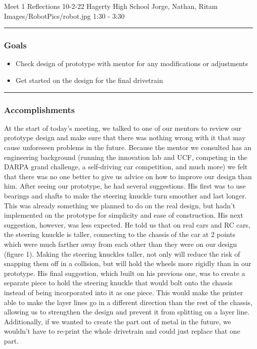 \insertmeeting 
	{Meet 1 Reflections} 
	{10-2-22} 
	{Hagerty High School}
	{Jorge, Nathan, Ritam}
	{Images/RobotPics/robot.jpg}
	{1:30 - 3:30}
	
\noindent\hfil\rule{\textwidth}{.4pt}\hfil
\subsubsection*{Goals}
\begin{itemize}
    \item Check design of prototype with mentor for any modifications or adjustments
    \item Get started on the design for the final drivetrain


\end{itemize} 

\noindent\hfil\rule{\textwidth}{.4pt}\hfil

\subsubsection*{Accomplishments}
At the start of today’s meeting, we talked to one of our mentors to review our prototype design and make sure that there was nothing wrong with it that may cause unforeseen problems in the future. Because the mentor we consulted has an engineering background (running the innovation lab and UCF, competing in the DARPA grand challenge, a self-driving car competition, and much more) we felt that there was no one better to give us advice on how to improve our design than him. After seeing our prototype, he had several suggestions. His first was to use bearings and shafts to make the steering knuckle turn smoother and last longer. This was already something we planned to do on the real design, but hadn’t implemented on the prototype for simplicity and ease of construction. His next suggestion, however, was less expected. He told us that on real cars and RC cars, the steering knuckle is taller, connecting to the chassis of the car at 2 points which were much farther away from each other than they were on our design (figure 1). Making the steering knuckles taller, not only will reduce the risk of snapping them off in a collision, but will hold the wheels more rigidly than in our prototype. His final suggestion, which built on his previous one, was to create a separate piece to hold the steering knuckle that would bolt onto the chassis instead of being incorporated into it as one piece. This would make the printer able to make the layer lines go in a different direction than the rest of the chassis, allowing us to strengthen the design and prevent it from splitting on a layer line. Additionally, if we wanted to create the part out of metal in the future, we wouldn’t have to re-print the whole drivetrain and could just replace that one part.

